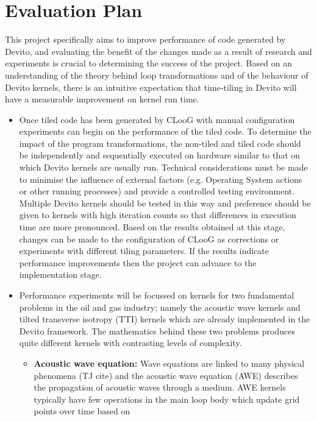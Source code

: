 \documentclass[a4paper,12pt,twoside]{report}
\begin{document}
\chapter{Evaluation Plan}
This project specifically aims to improve performance of code generated by Devito, and evaluating the benefit of the changes made
as a result of research and experiments is crucial to determining the success of the project. Based on an understanding of the theory
behind loop transformations and of the behaviour of Devito kernels, there is an intuitive expectation that time-tiling in Devito will 
have a measurable improvement on kernel run time.
\begin{itemize}
    \item Once tiled code has been generated by CLooG with manual configuration experiments can begin on the performance
        of the tiled code. To determine the impact of the program transformations, the non-tiled and tiled code should be independently
        and sequentially executed on hardware similar to that on which Devito kernels are usually run. Technical considerations must be made
        to minimise the influence of external factors (e.g. Operating System actions or other running processes) and provide a controlled testing
        environment. Multiple Devito kernels should be tested in this way and preference should be given to kernels with high iteration counts
        so that differences in execution time are more pronounced. Based on the results obtained at this stage, changes can be made to the configuration
        of CLooG as corrections or experiments with different tiling parameters. If the results indicate performance improvements then the project can advance
        to the implementation stage.
    \item Performance experiments will be focussed on kernels for two fundamental problems in the oil and gas industry; namely the acoustic wave kernels \cite{DevitoAcoustic}
        and tilted transverse isotropy (TTI) kernels \cite{DevitoAcoustic} which are already implemented in the Devito framework. The mathematics 
        behind these two problems produces quite different kernels with contrasting levels of complexity.
        \begin{itemize}
            \item \textbf{Acoustic wave equation:} Wave equations are linked to many physical phenomena (TJ cite) and the acoustic wave equation (AWE) describes the propagation
                of acoustic waves through a medium. AWE kernels typically have few operations in the main loop body which update grid points over time based on

\end{itemize}
\end{itemize}
\end{document}
